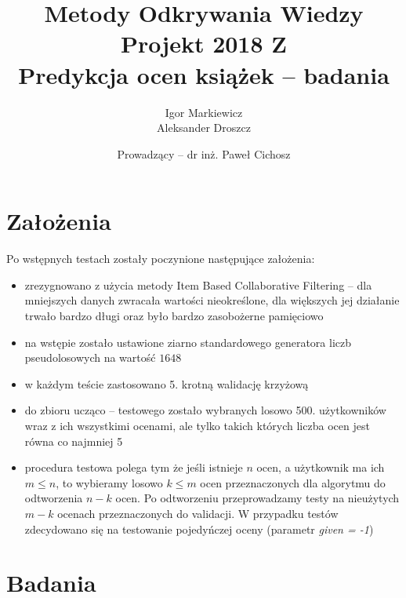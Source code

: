 \documentclass[12pt]{article}
\title{\Huge \textbf{Metody Odkrywania Wiedzy}\\ Projekt 2018 Z\\
\vspace{5mm} Predykcja ocen książek -- badania}
\author{Igor Markiewicz\\ Aleksander Droszcz}
\date{Prowadzący -- dr inż. Paweł Cichosz}
\begin{document}
\begin{titlingpage}
\thispagestyle{empty}
\vspace*{\fill}
\begin{center}
\maketitle
\end{center}
\vspace*{\fill}
\end{titlingpage}
\begin{flushleft}
\tableofcontents
\thispagestyle{empty}

\thispagestyle{empty}

\newpage
\justifying
\section{Założenia}
Po wstępnych testach zostały poczynione następujące założenia:
\begin{itemize}
\item zrezygnowano z użycia metody Item Based Collaborative Filtering -- dla mniejszych danych zwracała wartości nieokreślone, dla większych jej działanie trwało bardzo długi oraz było bardzo zasobożerne pamięciowo
\item na wstępie zostało ustawione ziarno standardowego generatora liczb pseudolosowych na wartość $1648$
\item w każdym teście zastosowano 5. krotną walidację krzyżową
\item do zbioru ucząco -- testowego zostało wybranych losowo 500. użytkowników wraz z ich wszystkimi ocenami, ale tylko takich których liczba ocen jest równa co najmniej 5
\item procedura testowa polega tym że jeśli istnieje $n$ ocen, a użytkownik ma ich $m \leq n$, to wybieramy losowo $k \leq m$ ocen przeznaczonych dla algorytmu do odtworzenia $n - k$ ocen. Po odtworzeniu przeprowadzamy testy na nieużytych $m - k$ ocenach przeznaczonych do validacji. W przypadku testów zdecydowano się na testowanie pojedyńczej oceny (parametr \textit{given = -1})
\end{itemize}
\section{Badania}

\end{flushleft}
\end{document}
